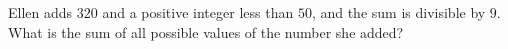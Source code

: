 Ellen adds $320$ and a positive integer less than $50$, and the sum is divisible by $9$. What is the sum of all possible values of the number she added?
